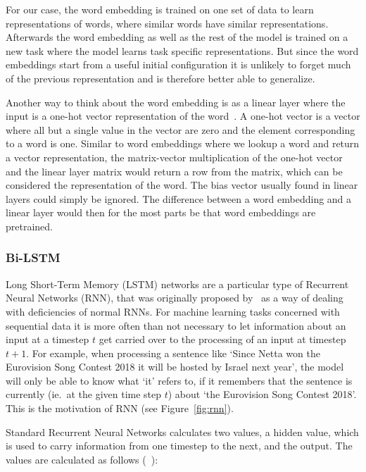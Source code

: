 For our case, the word embedding is trained on one set of data to learn
representations of words, where similar words have similar representations.
Afterwards the word embedding as well as the rest of the model is trained on a
new task where the model learns task specific representations. But since the
word embeddings start from a useful initial configuration it is unlikely to
forget much of the previous representation and is therefore better able to
generalize.

Another way to think about the word embedding is as a linear layer where the
input is a one-hot vector representation of the word~\cite{goldberg2017nerual}.
A one-hot vector is a vector where all but a single value in the vector are zero
and the element corresponding to a word is one. Similar to word embeddings where
we lookup a word and return a vector representation, the matrix-vector
multiplication of the one-hot vector and the linear layer matrix would return a
row from the matrix, which can be considered the representation of the word. The
bias vector usually found in linear layers could simply be ignored. The
difference between a word embedding and a linear layer would then for the most
parts be that word embeddings are pretrained.

\subsubsection{Bi-LSTM}\label{sec:setup-models-lstm}

Long Short-Term Memory (LSTM) networks are a particular type of Recurrent Neural
Networks (RNN), that was originally proposed by~\cite{hochreiter1997long} as a
way of dealing with deficiencies of normal RNNs. For machine learning tasks
concerned with sequential data it is more often than not necessary to let
information about an input at a timestep $t$ get carried over to the processing
of an input at timestep $t+1$. For example, when processing a sentence like
`Since Netta won the Eurovision Song Contest 2018 it will be hosted by Israel
next year', the model will only be able to know what `it' refers to, if it
remembers that the sentence is currently (ie.\ at the given time step $t$) about
`the Eurovision Song Contest 2018'. This is the motivation of RNN (see
Figure~\ref{fig:rnn}).

Standard Recurrent Neural Networks calculates two values, a hidden value, which
is used to carry information from one timestep to the next, and the output. The
values are calculated as follows (~\cite{goodfellow2016deep}):


